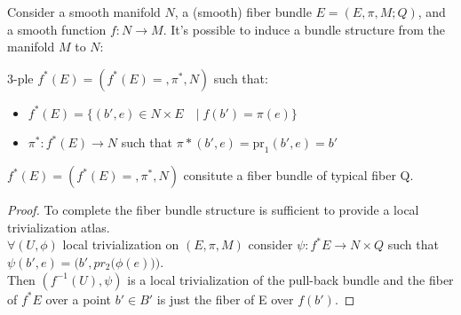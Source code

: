 \documentclass[Main]{subfiles}
\begin{document}
			Consider a smooth manifold $N$, a (smooth) fiber bundle $E=(E,\pi,M;Q)$, and a smooth function $f: N \rightarrow M$. It's possible to induce\cite{Husemoller} a bundle structure from the manifold $M$ to $N$:
			\begin{definition}
				3-ple $f^* (E) = (f^* (E) =, \pi^*,N)$ such that:
				\begin{itemize}
					\item $f^* (E) =  \big\{ (b',e) \in N \times E \quad \big\vert \; f(b') = \pi(e) \big\} $
					\item $\pi^*:f^* (E) \rightarrow N $ such that $ \pi* (b',e) = \textrm{pr}_1 (b',e)= b' $
				\end{itemize}
			\end{definition}
			\begin{proposition}
				$f^* (E) = (f^* (E) =, \pi^*,N)$ consitute a fiber bundle of typical fiber Q.
			\end{proposition}
			\begin{proof}
				To complete the fiber bundle structure is sufficient to provide a local trivialization atlas.
				\\
				$\forall ( U, \phi)$ local trivialization on $(E, \pi, M)$  consider $\psi: f^* E \rightarrow N \times Q$ such that $\psi( b',e) = \bigg( b', pr_2 \big( \phi(e)\big)\bigg)$.
				\\
				Then $(f^{-1}(U),\psi)$ is a local trivialization of the pull-back bundle and the fiber of $f^*E$ over a point $b′\in B'$  is just the fiber of E over $f(b′)$.
			\end{proof}
\end{document}
